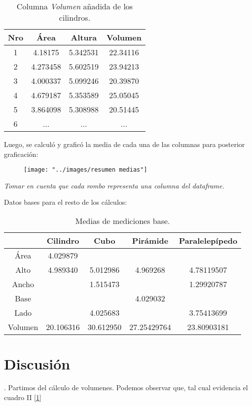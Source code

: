\documentclass[%
 reprint,
groupedaddress,
unsortedaddress,
 amsmath,amssymb,
 aps,
superscriptaddress
]{revtex4-2}
\begin{document}
\begin{table}[h]
	\centering
	\caption{Columna \textit{Volumen} añadida de los cilindros.}
	\begin{tabular}{|c|c|c|c|}
		\hline
		Nro & Área & Altura & Volumen\\
		\hline
		1 & 4.18175 & 5.342531 & 22.34116\\
		\hline
		2 & 4.273458 & 5.602519 & 23.94213\\
		\hline
		3 & 4.000337 & 5.099246 & 20.39870\\
		\hline
		4 &4.679187&5.353589&25.05045\\
		\hline
		5 &3.864098&5.308988&20.51445\\
		\hline
		6 &...&...&...\\
		\hline
	\end{tabular}
\end{table}

Luego, se calculó y graficó la media de cada una de las columnas para posterior graficación: 
\begin{figure}[h]
	\centering
	\texttt{[image: "../images/resumen medias"]}
	\caption{}
	\label{fig:resumen-medias}
\end{figure}

\textit{Tomar en cuenta que cada rombo representa una columna del dataframe.}


Datos bases para el resto de los cálculos:

\begin{table}[h]
	\centering
	\label{table:mediasbases}
	\caption{Medias de mediciones base.}
	\begin{tabular}{|c|c|c|c|c|}
		\hline
		& Cilindro & Cubo & Pirámide & Paralelepípedo \\
		\hline
		Área & 4.029879 &  &  &\\
		\hline
		Alto & 4.989340 & 5.012986 & 4.969268 & 4.78119507\\
		\hline
		Ancho &  & 1.515473 & & 1.29920787\\
		\hline
		Base &  &  & 4.029032&\\
		\hline
		Lado &  &4.025683  &  & 3.75413699\\
		\hline
		Volumen & 20.106316 & 30.612950  & 27.25429764 & 23.80903181\\
		\hline
		
	\end{tabular}
\end{table}

\section{Discusión}
\label{Sec:Disc}.
Partimos del cálculo de volumenes. Podemos observar que, tal cual evidencia el cuadro II [\ref{table:mediasbases}]
\end{document}
